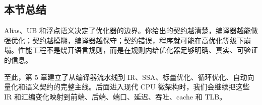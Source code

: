 \subsection{本节总结}

Alias、UB 和浮点语义决定了优化器的边界。你给出的契约越清楚，编译器越能做强优化；契约越模糊，编译器越保守；契约错误，程序就可能在高优化等级下崩塌。性能工程不是绕开语言规则，而是在规则内给优化器足够明确、真实、可验证的信息。

至此，第 5 章建立了从编译器流水线到 IR、SSA、标量优化、循环优化、自动向量化和语义契约的完整主线。后面进入现代 CPU 微架构时，我们会继续把这些 IR 和汇编变化映射到前端、后端、端口、延迟、吞吐、cache 和 TLB。
